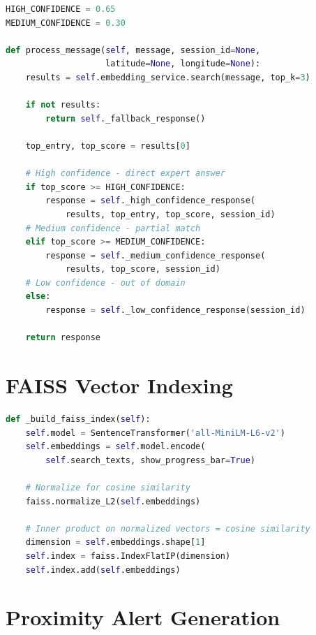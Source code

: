 \begin{lstlisting}[language=Python,caption={chat\_service.py --- Three-tier confidence scoring},label={lst:chat_confidence}]
HIGH_CONFIDENCE = 0.65
MEDIUM_CONFIDENCE = 0.30

def process_message(self, message, session_id=None, 
                    latitude=None, longitude=None):
    results = self.embedding_service.search(message, top_k=3)
    
    if not results:
        return self._fallback_response()
    
    top_entry, top_score = results[0]
    
    # High confidence - direct expert answer
    if top_score >= HIGH_CONFIDENCE:
        response = self._high_confidence_response(
            results, top_entry, top_score, session_id)
    # Medium confidence - partial match
    elif top_score >= MEDIUM_CONFIDENCE:
        response = self._medium_confidence_response(
            results, top_score, session_id)
    # Low confidence - out of domain
    else:
        response = self._low_confidence_response(session_id)
    
    return response
\end{lstlisting}


\section{FAISS Vector Indexing}

\begin{lstlisting}[language=Python,caption={embedding\_service.py --- FAISS index construction},label={lst:faiss}]
def _build_faiss_index(self):
    self.model = SentenceTransformer('all-MiniLM-L6-v2')
    self.embeddings = self.model.encode(
        self.search_texts, show_progress_bar=True)
    
    # Normalize for cosine similarity
    faiss.normalize_L2(self.embeddings)
    
    # Inner product on normalized vectors = cosine similarity
    dimension = self.embeddings.shape[1]
    self.index = faiss.IndexFlatIP(dimension)
    self.index.add(self.embeddings)
\end{lstlisting}


\section{Proximity Alert Generation}

